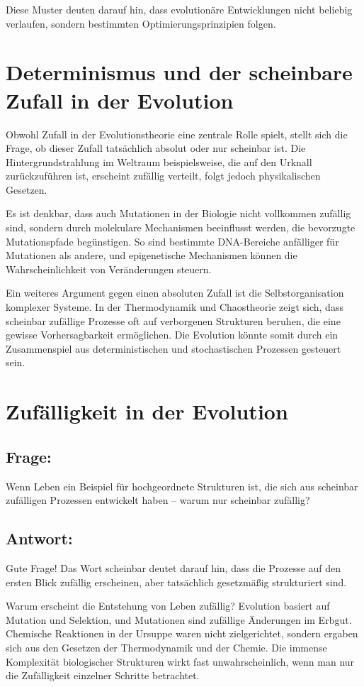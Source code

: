 \documentclass{article}
\begin{document}
	Diese Muster deuten darauf hin, dass evolutionäre Entwicklungen nicht beliebig verlaufen, sondern bestimmten Optimierungsprinzipien folgen.
	
	\section{Determinismus und der scheinbare Zufall in der Evolution}
	Obwohl Zufall in der Evolutionstheorie eine zentrale Rolle spielt, stellt sich die Frage, ob dieser Zufall tatsächlich absolut oder nur scheinbar ist. Die Hintergrundstrahlung im Weltraum beispielsweise, die auf den Urknall zurückzuführen ist, erscheint zufällig verteilt, folgt jedoch physikalischen Gesetzen.
	
	Es ist denkbar, dass auch Mutationen in der Biologie nicht vollkommen zufällig sind, sondern durch molekulare Mechanismen beeinflusst werden, die bevorzugte Mutationspfade begünstigen. So sind bestimmte DNA-Bereiche anfälliger für Mutationen als andere, und epigenetische Mechanismen können die Wahrscheinlichkeit von Veränderungen steuern.
	
	Ein weiteres Argument gegen einen absoluten Zufall ist die Selbstorganisation komplexer Systeme. In der Thermodynamik und Chaostheorie zeigt sich, dass scheinbar zufällige Prozesse oft auf verborgenen Strukturen beruhen, die eine gewisse Vorhersagbarkeit ermöglichen. Die Evolution könnte somit durch ein Zusammenspiel aus deterministischen und stochastischen Prozessen gesteuert sein.
	
	\section{Zufälligkeit in der Evolution}
	
	\subsection*{Frage:}
	Wenn Leben ein Beispiel für hochgeordnete Strukturen ist, die sich aus scheinbar zufälligen Prozessen entwickelt haben – warum nur scheinbar zufällig?
	
	\subsection*{Antwort:}
	Gute Frage! Das Wort scheinbar deutet darauf hin, dass die Prozesse auf den ersten Blick zufällig erscheinen, aber tatsächlich gesetzmäßig strukturiert sind.
	
	Warum erscheint die Entstehung von Leben zufällig?
	Evolution basiert auf Mutation und Selektion, und Mutationen sind zufällige Änderungen im Erbgut.
	Chemische Reaktionen in der Ursuppe waren nicht zielgerichtet, sondern ergaben sich aus den Gesetzen der Thermodynamik und der Chemie.
	Die immense Komplexität biologischer Strukturen wirkt fast unwahrscheinlich, wenn man nur die Zufälligkeit einzelner Schritte betrachtet.
	
\end{document}
